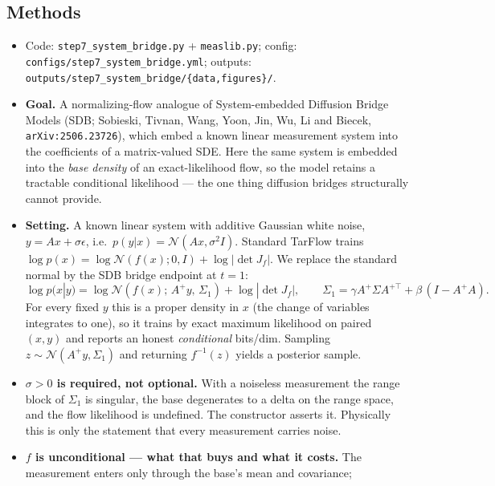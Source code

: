 \documentclass[11pt]{article}
\begin{document}
\subsection{Methods}
\begin{itemize}
  \item Code: \texttt{step7\_system\_bridge.py} + \texttt{measlib.py}; config:
        \texttt{configs/step7\_system\_bridge.yml}; outputs:
        \texttt{outputs/step7\_system\_bridge/\{data,figures\}/}.
  \item \textbf{Goal.} A normalizing-flow analogue of System-embedded
        Diffusion Bridge Models (SDB; Sobieski, Tivnan, Wang, Yoon, Jin, Wu, Li and
        Biecek, \texttt{arXiv:2506.23726}), which embed a known
        linear measurement system into the coefficients of a matrix-valued
        SDE. Here the same system is embedded into the \emph{base density} of
        an exact-likelihood flow, so the model retains a tractable
        conditional likelihood --- the one thing diffusion bridges
        structurally cannot provide.
  \item \textbf{Setting.} A known linear system with additive Gaussian white
        noise, $y = Ax + \sigma\epsilon$, i.e.\
        $p(y|x) = \mathcal{N}(Ax, \sigma^2 I)$. Standard TarFlow trains
        $\log p(x) = \log \mathcal{N}(f(x); 0, I) + \log|\det J_f|$. We
        replace the standard normal by the SDB bridge endpoint at $t=1$:
        \[
          \log p(x|y) = \log \mathcal{N}\!\left(f(x);\, A^{+}y,\, \Sigma_1\right)
                        + \log|\det J_f|, \qquad
          \Sigma_1 = \gamma A^{+}\Sigma A^{+\top} + \beta\,(I - A^{+}A).
        \]
        For every fixed $y$ this is a proper density in $x$ (the change of
        variables integrates to one), so it trains by exact maximum
        likelihood on paired $(x,y)$ and reports an honest \emph{conditional}
        bits/dim. Sampling $z \sim \mathcal{N}(A^{+}y, \Sigma_1)$ and
        returning $f^{-1}(z)$ yields a posterior sample.
  \item \textbf{$\sigma > 0$ is required, not optional.} With a noiseless
        measurement the range block of $\Sigma_1$ is singular, the base
        degenerates to a delta on the range space, and the flow likelihood is
        undefined. The constructor asserts it. Physically this is only the
        statement that every measurement carries noise.
  \item \textbf{$f$ is unconditional --- what that buys and what it costs.}
        The measurement enters only through the base's mean and covariance;

\end{itemize}
\end{document}
